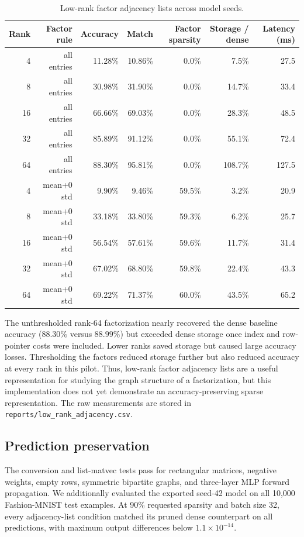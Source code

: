 \documentclass[11pt]{article}
\begin{document}
\begin{table}[ht]
\centering
\caption{Low-rank factor adjacency lists across model seeds.}
\label{tab:lowrank}
\small
\begin{tabular}{rrrrrrr}
\toprule
Rank & Factor rule & Accuracy & Match & Factor sparsity & Storage / dense & Latency (ms) \\
\midrule
4  & all entries & 11.28\% & 10.86\% & 0.0\%  & 7.5\%  & 27.5 \\
8  & all entries & 30.98\% & 31.90\% & 0.0\%  & 14.7\% & 33.4 \\
16 & all entries & 66.66\% & 69.03\% & 0.0\%  & 28.3\% & 48.5 \\
32 & all entries & 85.89\% & 91.12\% & 0.0\%  & 55.1\% & 72.4 \\
64 & all entries & 88.30\% & 95.81\% & 0.0\%  & 108.7\% & 127.5 \\
\midrule
4  & mean+0 std & 9.90\%  & 9.46\%  & 59.5\% & 3.2\%  & 20.9 \\
8  & mean+0 std & 33.18\% & 33.80\% & 59.3\% & 6.2\%  & 25.7 \\
16 & mean+0 std & 56.54\% & 57.61\% & 59.6\% & 11.7\% & 31.4 \\
32 & mean+0 std & 67.02\% & 68.80\% & 59.8\% & 22.4\% & 43.3 \\
64 & mean+0 std & 69.22\% & 71.37\% & 60.0\% & 43.5\% & 65.2 \\
\bottomrule
\end{tabular}
\end{table}

The unthresholded rank-64 factorization nearly recovered the dense baseline
accuracy ($88.30\%$ versus $88.99\%$) but exceeded dense storage once index
and row-pointer costs were included.  Lower ranks saved storage but caused
large accuracy losses.  Thresholding the factors reduced storage further but
also reduced accuracy at every rank in this pilot.  Thus, low-rank factor
adjacency lists are a useful representation for studying the graph structure
of a factorization, but this implementation does not yet demonstrate an
accuracy-preserving sparse representation.  The raw measurements are stored
in \texttt{reports/low_rank_adjacency.csv}.

\subsection{Prediction preservation}

The conversion and list-matvec tests pass for rectangular matrices, negative
weights, empty rows, symmetric bipartite graphs, and three-layer MLP forward
propagation.  We additionally evaluated the exported seed-42 model on all
10,000 Fashion-MNIST test examples.  At 90\% requested sparsity and batch size
32, every adjacency-list condition matched its pruned dense counterpart on
all predictions, with maximum output differences below $1.1\times10^{-14}$.
\end{document}
